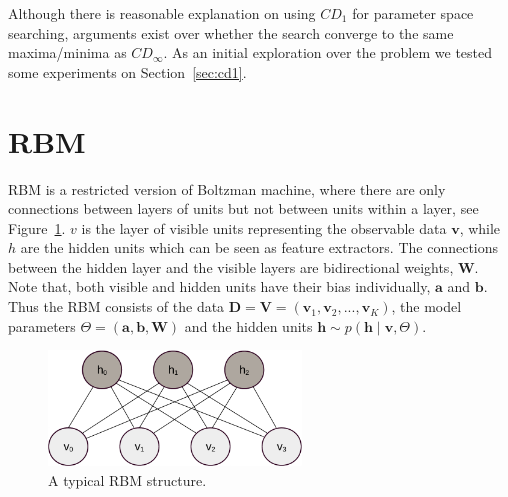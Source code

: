 \documentclass[11pt,twoside,a4paper]{article}
\begin{document}
	Although there is reasonable explanation on using $CD_1$ for parameter space searching, arguments exist over whether the search converge to the same maxima/minima as $CD_\infty$.
	As an initial exploration over the problem we tested some experiments on Section~\ref{sec:cd1}. 
\section{RBM\cite{zhang2013rbm}}
	RBM is a restricted version of Boltzman machine, where there are only connections between layers of units but not between units within a layer, see Figure~\ref{fig:RBM}.
	$ v $ is the layer of visible units representing the observable data $ \mathbf{v} $, while $ h $ are the hidden units which can be seen as feature extractors.
	The connections between the hidden layer and the visible layers are bidirectional weights, $ \mathbf{W} $.
	Note that, both visible and hidden units have their bias individually, $ \mathbf{a} $ and $ \mathbf{b} $.
	Thus the RBM consists of the data $ \mathbf{D} = \mathbf{V} = (\mathbf{v}_1, \mathbf{v}_2, ..., \mathbf{v}_K ) $, the model parameters $ \Theta = (\mathbf{a}, \mathbf{b}, \mathbf{W}) $ and the hidden units $ \mathbf{h} \sim p(\mathbf{h} \mid \mathbf{v}, \Theta) $.
	\begin{figure}[hbt]
	\centering
		\includegraphics[width=0.6\textwidth]{img/RBM.pdf}
		\caption{A typical RBM structure.}
		\label{fig:RBM}
	\end{figure}
	
\end{document}
